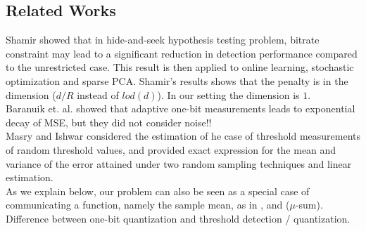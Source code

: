 \documentclass[letterpaper, conference]{IEEEtran}      %
\begin{document}
%


\subsection*{Related Works}
{\color{red} Shamir \cite{Shamir} showed that in hide-and-seek hypothesis testing problem, bitrate constraint may lead to a significant reduction in detection performance compared to the unrestricted case. This result is then applied to online learning, stochastic optimization and sparse PCA. Shamir's results shows that the penalty is in the dimension ($d/R$ instead of $lod(d)$). In our setting the dimension is $1$. \\
Baranuik et. al. \cite{baraniuk2017exponential} showed that adaptive one-bit measurements leads to exponential decay of MSE, but they did not consider noise!! \\
Masry and Ishwar 
\cite{masry2009field} considered the estimation of 
he case of threshold measurements of random threshold values, and provided exact expression for the mean and variance of the
error attained under two random sampling techniques and linear estimation. \\
As we explain below, our problem can also be seen as a special case of communicating a function, namely the sample mean, as in \cite{1413468}, and ($\mu$-sum).
Difference between one-bit quantization and threshold detection / quantization. 
} 
\end{document}
